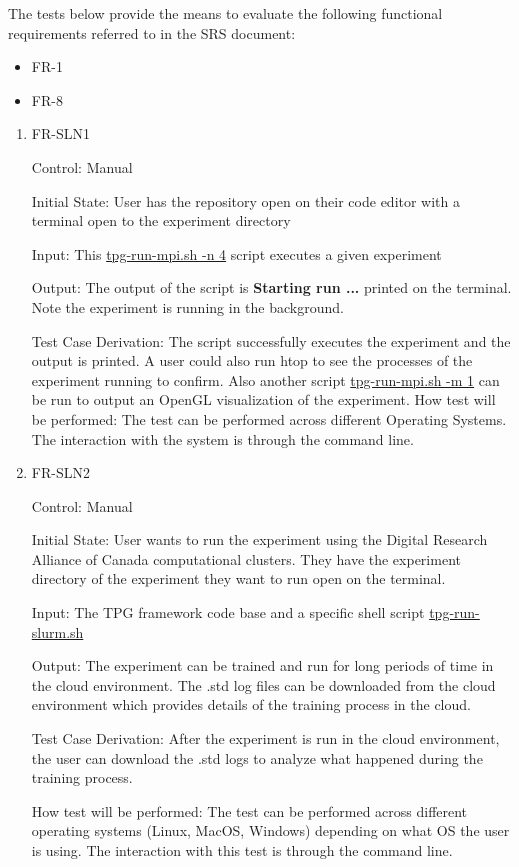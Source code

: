 \documentclass[12pt, titlepage]{article}
\begin{document}
The tests below provide the means to evaluate the following functional requirements referred to in the SRS document:
\begin{itemize}
  \item FR-1
  \item FR-8
\end{itemize}

\begin{enumerate}

\item{FR-SLN1}

Control: Manual
					
Initial State: User has the repository open on their code editor with a terminal open to the experiment directory
					
Input: This \href{https://github.com/TPGEngine/tpg/blob/main/src/scripts/run/tpg-run-mpi.sh}{tpg-run-mpi.sh -n 4} script executes a given experiment
					
Output: The output of the script is \textbf{Starting run ...} printed on the terminal. Note the experiment is running in the background.

Test Case Derivation: The script successfully executes the experiment and the output is printed. A user could also run htop to see the processes of the experiment running to confirm. Also another script \href{https://github.com/TPGEngine/tpg/blob/main/src/scripts/run/tpg-run-mpi.sh}{tpg-run-mpi.sh -m 1} can be run to output an OpenGL visualization of the experiment. 
How test will be performed: The test can be performed across different Operating Systems. The interaction with the system is through the command line.
					
\item{FR-SLN2}

Control: Manual
					
Initial State: User wants to run the experiment using the Digital Research Alliance of Canada computational clusters. They have the experiment directory of the experiment they want to run open on the terminal.
					
Input: The TPG framework code base and a specific shell script \href{https://github.com/TPGEngine/tpg/blob/main/src/scripts/run/tpg-run-slurm.sh}{tpg-run-slurm.sh}
					
Output: The experiment can be trained and run for long periods of time in the cloud environment. The .std log files can be downloaded from the cloud environment which provides details of the training process in the cloud.

Test Case Derivation: After the experiment is run in the cloud environment, the user can download the .std logs to analyze what happened during the training process.

How test will be performed: The test can be performed across different operating systems (Linux, MacOS, Windows) depending on what OS the user is using. The interaction with this test is through the command line.

\end{enumerate}
\end{document}
